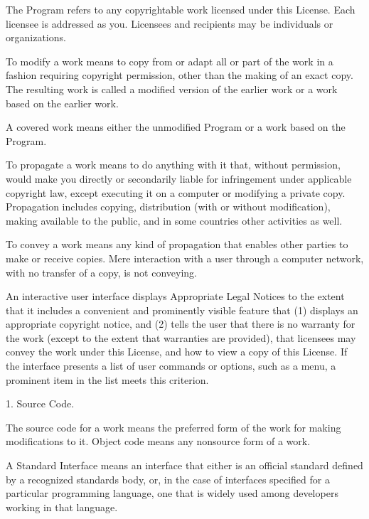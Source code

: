 \documentclass[letterpaper,10pt,english]{sphinxmanual}
\begin{document}
\begin{sphinxVerbatim}[commandchars=\\\{\}]
  \PYGZdq{}The Program\PYGZdq{} refers to any copyrightable work licensed under this
License.  Each licensee is addressed as \PYGZdq{}you\PYGZdq{}.  \PYGZdq{}Licensees\PYGZdq{} and
\PYGZdq{}recipients\PYGZdq{} may be individuals or organizations.

  To \PYGZdq{}modify\PYGZdq{} a work means to copy from or adapt all or part of the work
in a fashion requiring copyright permission, other than the making of an
exact copy.  The resulting work is called a \PYGZdq{}modified version\PYGZdq{} of the
earlier work or a work \PYGZdq{}based on\PYGZdq{} the earlier work.

  A \PYGZdq{}covered work\PYGZdq{} means either the unmodified Program or a work based
on the Program.

  To \PYGZdq{}propagate\PYGZdq{} a work means to do anything with it that, without
permission, would make you directly or secondarily liable for
infringement under applicable copyright law, except executing it on a
computer or modifying a private copy.  Propagation includes copying,
distribution (with or without modification), making available to the
public, and in some countries other activities as well.

  To \PYGZdq{}convey\PYGZdq{} a work means any kind of propagation that enables other
parties to make or receive copies.  Mere interaction with a user through
a computer network, with no transfer of a copy, is not conveying.

  An interactive user interface displays \PYGZdq{}Appropriate Legal Notices\PYGZdq{}
to the extent that it includes a convenient and prominently visible
feature that (1) displays an appropriate copyright notice, and (2)
tells the user that there is no warranty for the work (except to the
extent that warranties are provided), that licensees may convey the
work under this License, and how to view a copy of this License.  If
the interface presents a list of user commands or options, such as a
menu, a prominent item in the list meets this criterion.

  1. Source Code.

  The \PYGZdq{}source code\PYGZdq{} for a work means the preferred form of the work
for making modifications to it.  \PYGZdq{}Object code\PYGZdq{} means any non\PYGZhy{}source
form of a work.

  A \PYGZdq{}Standard Interface\PYGZdq{} means an interface that either is an official
standard defined by a recognized standards body, or, in the case of
interfaces specified for a particular programming language, one that
is widely used among developers working in that language.


\end{sphinxVerbatim}
\end{document}
